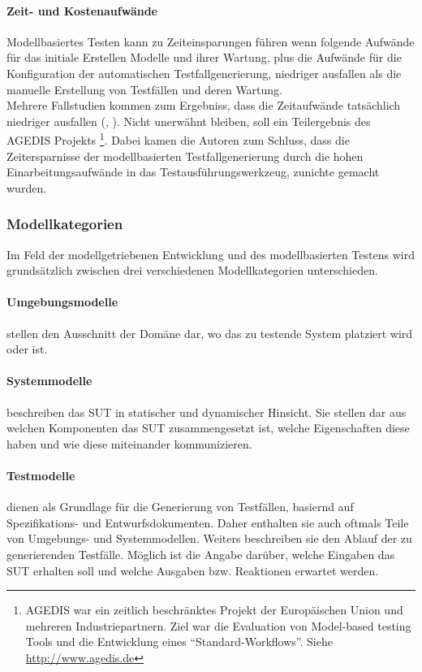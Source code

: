 \paragraph{Zeit- und Kostenaufwände} Modellbasiertes Testen kann zu Zeiteinsparungen führen wenn folgende Aufwände für das initiale Erstellen Modelle und ihrer Wartung, plus die Aufwände für die Konfiguration der automatischen Testfallgenerierung, niedriger ausfallen als die manuelle Erstellung von Testfällen und deren Wartung. \\
Mehrere Fallstudien kommen zum Ergebniss, dass die Zeitaufwände tatsächlich niedriger ausfallen (\cite{dalal_model-based_1999}, \cite{farchi_using_2002}). Nicht unerwähnt bleiben, soll ein Teilergebnis des AGEDIS Projekts \footnote{AGEDIS war ein zeitlich beschränktes Projekt der Europäischen Union und mehreren Industriepartnern. Ziel war die Evaluation von Model-based testing Tools und die Entwicklung eines ``Standard-Workflows''. Siehe \url{http://www.agedis.de}}. Dabei kamen die Autoren zum Schluss, dass die Zeitersparnisse der modellbasierten Testfallgenerierung durch die hohen Einarbeitungsaufwände in das Testausführungswerkzeug, zunichte gemacht wurden.
\subsubsection{Modellkategorien}
Im Feld der modellgetriebenen Entwicklung und des modellbasierten Testens wird grundsätzlich zwischen drei verschiedenen Modellkategorien unterschieden.

\paragraph{Umgebungsmodelle} stellen den Ausschnitt der Domäne dar, wo das zu testende System platziert wird oder ist.
\paragraph{Systemmodelle} beschreiben das SUT in statischer und dynamischer Hinsicht. Sie stellen dar aus welchen Komponenten das SUT zusammengesetzt ist, welche Eigenschaften diese haben und wie diese miteinander kommunizieren. 
\paragraph{Testmodelle} dienen als Grundlage für die Generierung von Testfällen, basiernd auf Spezifikations- und Entwurfsdokumenten. Daher enthalten sie auch oftmals Teile von Umgebungs- und Systemmodellen. Weiters beschreiben sie den Ablauf der zu generierenden Testfälle. Möglich ist die Angabe darüber, welche Eingaben das SUT erhalten soll und welche Ausgaben bzw. Reaktionen erwartet werden.

